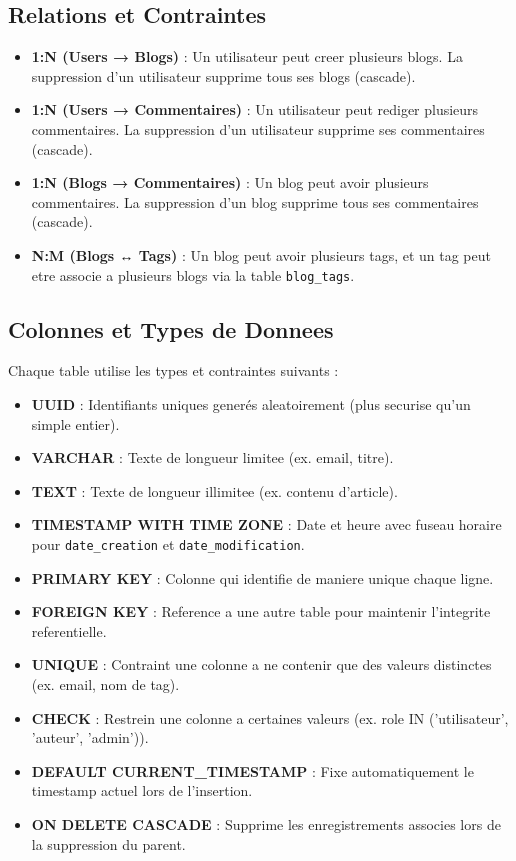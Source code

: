 \documentclass[a4paper,12pt]{book}
\begin{document}
\subsection{Relations et Contraintes}

\begin{itemize}
    \item \textbf{1:N (Users → Blogs)} : Un utilisateur peut creer plusieurs blogs. La suppression d'un utilisateur supprime tous ses blogs (cascade).
    \item \textbf{1:N (Users → Commentaires)} : Un utilisateur peut rediger plusieurs commentaires. La suppression d'un utilisateur supprime ses commentaires (cascade).
    \item \textbf{1:N (Blogs → Commentaires)} : Un blog peut avoir plusieurs commentaires. La suppression d'un blog supprime tous ses commentaires (cascade).
    \item \textbf{N:M (Blogs ↔ Tags)} : Un blog peut avoir plusieurs tags, et un tag peut etre associe a plusieurs blogs via la table \texttt{blog\_tags}.
\end{itemize}

\subsection{Colonnes et Types de Donnees}

Chaque table utilise les types et contraintes suivants :

\begin{itemize}
    \item \textbf{UUID} : Identifiants uniques generés aleatoirement (plus securise qu'un simple entier).
    \item \textbf{VARCHAR} : Texte de longueur limitee (ex. email, titre).
    \item \textbf{TEXT} : Texte de longueur illimitee (ex. contenu d'article).
    \item \textbf{TIMESTAMP WITH TIME ZONE} : Date et heure avec fuseau horaire pour \texttt{date\_creation} et \texttt{date\_modification}.
    \item \textbf{PRIMARY KEY} : Colonne qui identifie de maniere unique chaque ligne.
    \item \textbf{FOREIGN KEY} : Reference a une autre table pour maintenir l'integrite referentielle.
    \item \textbf{UNIQUE} : Contraint une colonne a ne contenir que des valeurs distinctes (ex. email, nom de tag).
    \item \textbf{CHECK} : Restrein une colonne a certaines valeurs (ex. role IN ('utilisateur', 'auteur', 'admin')).
    \item \textbf{DEFAULT CURRENT\_TIMESTAMP} : Fixe automatiquement le timestamp actuel lors de l'insertion.
    \item \textbf{ON DELETE CASCADE} : Supprime les enregistrements associes lors de la suppression du parent.
\end{itemize}
\end{document}
